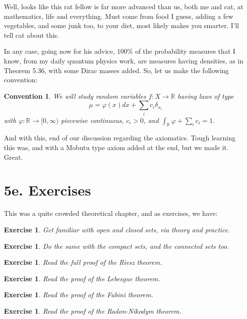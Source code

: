 \documentclass[12pt]{amsbook}
\newtheorem{convention}[theorem]{Convention}
\newtheorem{exercise}[theorem]{Exercise}
\begin{document}
Well, looks like this rat fellow is far more advanced than us, both me and cat, at mathematics, life and everything. Must come from food I guess, adding a few vegetables, and some junk too, to your diet, most likely makes you smarter. I'll tell cat about this.

\bigskip

In any case, going now for his advice, $100\%$ of the probability measures that I know, from my daily quantum physics work, are measures having densities, as in Theorem 5.36, with some Dirac masses added. So, let us make the following convention:

\begin{convention}
We will study random variables $f:X\to\mathbb R$ having laws of type
$$\mu=\varphi(x)dx+\sum_ic_i\delta_{x_i}$$
with $\varphi:\mathbb R\to[0,\infty)$ piecewise continuous, $c_i>0$, and $\int_\mathbb R\varphi+\sum_ic_i=1$.
\end{convention}

And with this, end of our discussion regarding the axiomatics. Tough learning this was, and with a Mobutu type axiom added at the end, but we made it. Great.

\section*{5e. Exercises}

This was a quite crowded theoretical chapter, and as exercises, we have:

\begin{exercise}
Get familiar with open and closed sets, via theory and practice.
\end{exercise}

\begin{exercise}
Do the same with the compact sets, and the connected sets too.
\end{exercise}

\begin{exercise}
Read the full proof of the Riesz theorem.
\end{exercise}

\begin{exercise}
Read the proof of the Lebesgue theorem.
\end{exercise}

\begin{exercise}
Read the proof of the Fubini theorem.
\end{exercise}

\begin{exercise}
Read the proof of the Radon-Nikodym theorem.
\end{exercise}
\end{document}
